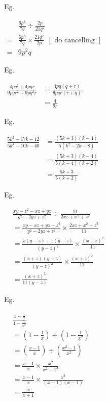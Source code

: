 \documentclass[twocolumn]{article}
\begin{document}
\bigskip 

\noindent 
Eg. 

\noindent 
$\begin{aligned} & \frac{6 p^3}{7 q} \div \frac{2 p}{21 q^2} \\ = & \frac{6 p^3}{7 q} \times \frac{21 q^2}{2 p} \ \ [\text { do cancelling }] \\ = & 9 p^2 q\end{aligned}$

\bigskip 

\noindent 
Eg. 

\noindent 
$\begin{aligned} \frac{4 p q^2+4 p q r}{9 p q r^2+9 p q^2 r} & =\frac{4 p q(q+r)}{9 p q r(r+q)} \\ & =\frac{4}{9 r}\end{aligned}$

\bigskip 

\bigskip 

\bigskip 

\bigskip 

\bigskip 

\bigskip 

\noindent 
Eg. 

\noindent 
$\begin{aligned} \frac{5 k^2-17 k-12}{5 k^2-10 k-40} & =\frac{(5 k+3)(k-4)}{5\left(k^2-2 k-8\right)} \\ & =\frac{(5 k+3)(k-4)}{5(k-4)(k+2)} \\ & =\frac{5 k+3}{5(k+2)}\end{aligned}$

\bigskip 

\noindent 
Eg. 

\noindent 
$\begin{aligned} & \frac{x y-z^2-x z+y z}{y^2-2 y z+z^2} \div \frac{11}{2 x z+x^2+z^2} \\ & =\frac{x y-x z+y z-z^2}{y^2-2 y z+z^2} \times \frac{2 x z+x^2+z^2}{11} \\ & =\frac{x(y-z)+z(y-z)}{(y-z)^2} \times \frac{(x+z)^2}{11} \\ & =\frac{(x+z)(y-z)}{(y-z)^2} \times \frac{(x+z)^2}{11} \\ & =\frac{(x+z)^3}{11(y-z)}\end{aligned}$


\bigskip 

\noindent 
Eg. 

\noindent 
$\begin{aligned} & \frac{1-\frac{1}{x}}{1-\frac{1}{x^2}} \\ & =\left(1-\frac{1}{x}\right) \div\left(1-\frac{1}{x^2}\right) \\ & =\left(\frac{x-1}{x}\right) \div\left(\frac{x^2-1}{x^2}\right) \\ & =\frac{x-1}{x} \times \frac{x^2}{x^2-1^2} \\ & =\frac{x-1}{x} \times \frac{x^2}{(x+1)(x-1)} \\ & =\frac{x}{x+1}\end{aligned}$
\end{document}
